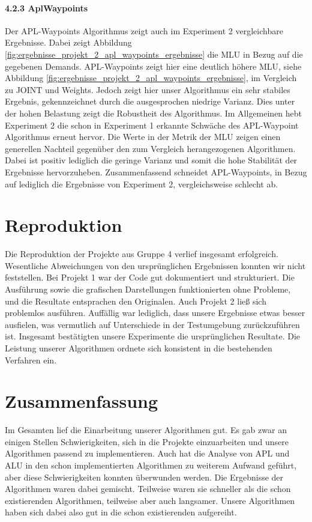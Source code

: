 \documentclass[sigconf,nonacm,review,language=english,language=german]{acmart}
\begin{document}
        \paragraph{4.2.3   AplWaypoints}
            Der APL-Waypoints Algorithmus zeigt auch im Experiment 2 vergleichbare Ergebnisse. Dabei zeigt Abbildung \ref{fig:ergebnisse_projekt_2_apl_waypoints_ergebnisse} die MLU in Bezug auf die gegebenen Demands.  APL-Waypoints zeigt hier eine deutlich höhere MLU, siehe Abbildung \ref{fig:ergebnisse_projekt_2_apl_waypoints_ergebnisse}, im Vergleich zu JOINT und Weights. Jedoch zeigt hier unser Algorithmus ein sehr stabiles Ergebnis, gekennzeichnet durch die ausgesprochen niedrige Varianz. Dies unter der hohen Belastung zeigt die Robustheit des Algorithmus. 
            Im Allgemeinen hebt Experiment 2 die schon in Experiment 1 erkannte Schwäche des APL-Waypoint Algorithmus erneut hervor. Die Werte in der Metrik der MLU zeigen einen generellen Nachteil gegenüber den zum Vergleich herangezogenen Algorithmen. Dabei ist positiv lediglich die geringe Varianz und somit die hohe Stabilität der Ergebnisse hervorzuheben. Zusammenfassend schneidet APL-Waypoints, in Bezug auf lediglich die Ergebnisse von Experiment 2, vergleichsweise schlecht ab.

\section{Reproduktion}
    Die Reproduktion der Projekte aus Gruppe 4 verlief insgesamt erfolgreich. Wesentliche
    Abweichungen von den ursprünglichen Ergebnissen konnten wir nicht feststellen.
    Bei Projekt 1 war der Code gut dokumentiert und strukturiert. Die Ausführung sowie die grafischen Darstellungen funktionierten ohne Probleme, und die Resultate entsprachen den Originalen.
    Auch Projekt 2 ließ sich problemlos ausführen. Auffällig war lediglich, dass unsere Ergebnisse etwas besser ausfielen, was vermutlich auf Unterschiede in der Testumgebung zurückzuführen ist. Insgesamt bestätigten unsere Experimente die ursprünglichen Resultate. Die Leistung unserer Algorithmen ordnete sich konsistent in die bestehenden Verfahren ein.

\section{Zusammenfassung}
    Im Gesamten lief die Einarbeitung unserer Algorithmen gut. Es gab zwar an einigen Stellen Schwierigkeiten, sich in die Projekte einzuarbeiten und unsere Algorithmen passend zu implementieren. Auch hat die Analyse von APL und ALU in den schon implementierten Algorithmen zu weiterem Aufwand geführt, aber diese Schwierigkeiten konnten überwunden werden. Die Ergebnisse der Algorithmen waren dabei gemischt. Teilweise waren sie schneller als die schon existierenden Algorithmen, teilweise aber auch langsamer. Unsere Algorithmen haben sich dabei also gut in die schon existierenden aufgereiht. \\
\end{document}
